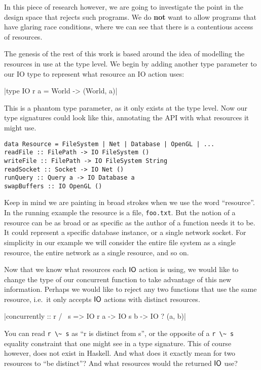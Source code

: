 \documentclass{report}
\begin{document}
In this piece of research however, we are going to investigate the point in the
design space that rejects such programs. We do \textbf{not} want to allow
programs that have glaring race conditions, where we can see that there is a
contentious access of resources.

The genesis of the rest of this work is based around the idea of modelling the
resources in use at the type level. We begin by adding another type parameter to
our IO type to represent what resource an IO action uses:

|type IO r a = World -> (World, a)|

This is a phantom type parameter, as it only exists at the type level. Now our
type signatures could look like this, annotating the API with what resources it
might use.

\begin{verbatim}
data Resource = FileSystem | Net | Database | OpenGL | ...
readFile :: FilePath -> IO FileSystem ()
writeFile :: FilePath -> IO FileSystem String
readSocket :: Socket -> IO Net ()
runQuery :: Query a -> IO Database a
swapBuffers :: IO OpenGL ()
\end{verbatim}

Keep in mind we are painting in broad strokes when we use the word
``resource''. In the running example the resource is a file,
\texttt{foo.txt}. But the notion of a resource can be as broad or as specific as
the author of a function needs it to be. It could represent a specific database
instance, or a single network socket. For simplicity in our example we will
consider the entire file system as a single resource, the entire network as
a single resource, and so on.

Now that we know what resources each $\mathsf{IO}$ action is using, we would like to
change the type of our concurrent function to take advantage of this new
information. Perhaps we would like to reject any two functions that use the same
resource, i.e.\ it only accepts $\mathsf{IO}$ actions with distinct resources.

|concurrently :: r /~ s => IO r a -> IO s b -> IO ? (a, b)|

You can read \verb$r \~ s$ as ``r is distinct from s'', or the opposite of a
\verb$r \~ s$ equality constraint that one might see in a type signature. This
of course however, does not exist in Haskell.  And what does it exactly mean for
two resources to ``be distinct''? And what resources would the returned $\mathsf{IO}$
use?
\end{document}
